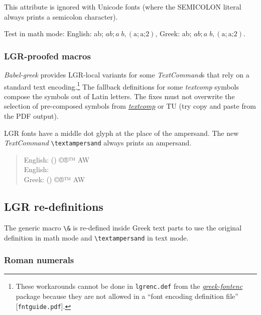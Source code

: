 \documentclass[a4paper]{article}
\newcommand{\file}{\texttt}
\newcommand{\cs}[1]{\texttt{\textbackslash#1}}
\newcommand{\pkgref}[1]{\emph{\href{https://ctan.org/pkg/#1}{#1}}}
\begin{document}
This attribute is ignored with Unicode fonts (where the SEMICOLON literal
always prints a semicolon character).

Test in math mode:
\newcommand{\semicolontest}{ab; $a b; a\;b, (\mathrm{a;}\textrm{a;}2)$}
English: \semicolontest, Greek: \foreignlanguage{greek}{\semicolontest}.

\subsubsection{LGR-proofed macros}

\emph{Babel-greek} provides LGR-local variants for some
\emph{TextCommand}s that rely on a standard text encoding.\footnote{%
  These workarounds cannot be done in \file{lgrenc.def} from the
  \pkgref{greek-fontenc} package because they are not allowed in a
  ``font encoding definition file'' [\file{fntguide.pdf}].}
The fallback definitions for some \emph{textcomp} symbols compose the
symbols out of Latin letters.
The fixes must not overwrite the selection of pre-composed symbols
from \pkgref{textcomp} or TU (try copy and paste from the PDF output).

LGR fonts have a middle dot glyph at the place of the ampersand. The new
\emph{TextCommand} \verb|\textampersand| always prints an ampersand.
\makeatletter \newcommand{\AsciiSymbolTest}{(\f@encoding) ©®™
                          A\textampersand W}
\makeatother
\begin{quote}
  English: \AsciiSymbolTest\\
  English: \ensuregreek{\AsciiSymbolTest}\\
  Greek: \foreignlanguage{greek}{\AsciiSymbolTest}
\end{quote}


\ifdefined\lgrfont%

  \subsection{LGR re-definitions \label{sec:LGR-redefinitions}}

  The generic macro \verb|\&| is re-defined inside Greek text parts to use
  the original definition in math mode and \cs{textampersand} in text
  mode.

  \subsubsection{Roman numerals \label{sec:roman-numerals}}
\end{document}
